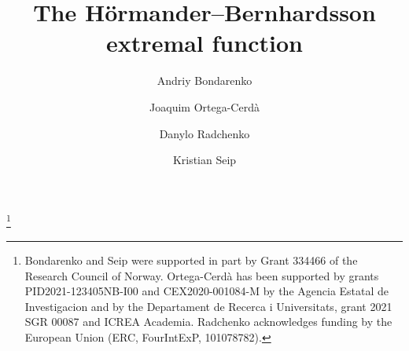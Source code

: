 \documentclass[12pt]{amsart}
\theoremstyle{plain}
\numberwithin{equation}{section}
\theoremstyle{definition}
\begin{document}
\title[The H\"{o}rmander--Bernhardsson extremal function ]
{The H\"{o}rmander--Bernhardsson extremal function}

\author[A. Bondarenko]{Andriy Bondarenko}
\address{Department of Mathematical Sciences \\ Norwegian University of Science and Technology \\ NO-7491 Trondheim \\ Norway}

\author[J. Ortega-Cerd\`{a}]{Joaquim Ortega-Cerd\`{a}}
\address{Department de Matem\`{a}tiques i Inform\`{a}tica, Universitat de
Barcelona, Gran Via 585, 08007 Barcelona, Spain and
CRM, Centre de Recerca Matemàtica, Campus de Bellaterra Edifici C, 08193
Bellaterra, Barcelona, Spain}

\author[D. Radchenko]{Danylo Radchenko}
\address{Laboratoire Paul Painlev\'e \\ Universit\'e de Lille \\ F-59655 Villeneuve d'Ascq \\ France}

\author[K. Seip]{Kristian Seip}
\address{Department of Mathematical Sciences, Norwegian University of Science and Technology (NTNU), 7491 Trondheim, Norway}

\thanks{Bondarenko and Seip were supported in part by Grant 334466 of the
Research Council of Norway. Ortega-Cerd\`a has been supported by grants
PID2021-123405NB-I00 and CEX2020-001084-M by the Agencia Estatal de
Investigacion and by the Departament de Recerca i Universitats, grant 2021 SGR
00087 and ICREA Academia. Radchenko acknowledges funding by the European Union 
(ERC, FourIntExP,
101078782).}
\end{document}
